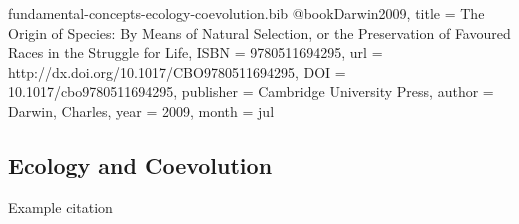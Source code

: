 \begin{bibunit}

\begin{filecontents*}[overwrite]{fundamental-concepts-ecology-coevolution.bib}
@book{Darwin2009,
  title = {The Origin of Species: By Means of Natural Selection,  or the Preservation of Favoured Races in the Struggle for Life},
  ISBN = {9780511694295},
  url = {http://dx.doi.org/10.1017/CBO9780511694295},
  DOI = {10.1017/cbo9780511694295},
  publisher = {Cambridge University Press},
  author = {Darwin,  Charles},
  year = {2009},
  month = jul 
}
\end{filecontents*} 

\subsection{Ecology and Coevolution}
\label{sec:ecology-and-coevolution}

Example citation \citep{Darwin2009}

    
\end{bibunit}
